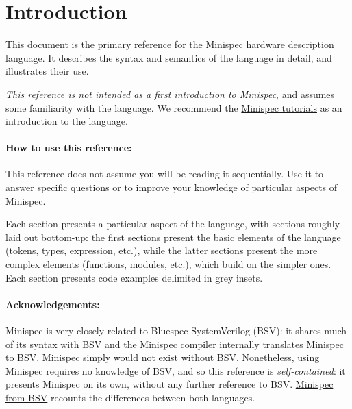 \section{Introduction}
\label{sec:intro}

This document is the primary reference for the Minispec hardware description language.
It describes the syntax and semantics of the language in detail, and illustrates their use.

\emph{This reference is not intended as a first introduction to Minispec}, and assumes some familiarity with the language.
We recommend the \href{https://6004.mit.edu/web/fall19/resources}{Minispec tutorials} as an introduction to the language.

\paragraph{How to use this reference:}
This reference does not assume you will be reading it sequentially.
Use it to answer specific questions or to improve your knowledge of particular aspects of Minispec.

Each section presents a particular aspect of the language, with sections roughly laid out bottom-up:
the first sections present the basic elements of the language (tokens, types, expression, etc.),
while the latter sections present the more complex elements (functions, modules, etc.), which build on the simpler ones.
Each section presents code examples delimited in \colorbox{codebg}{grey insets}.


\paragraph{Acknowledgements:}
Minispec is very closely related to Bluespec SystemVerilog (BSV): it shares much of its syntax with BSV
and the Minispec compiler internally translates Minispec to BSV.
Minispec simply would not exist without BSV.
Nonetheless, using Minispec requires no knowledge of BSV, and so
this reference is \emph{self-contained}: it presents Minispec on its own, without any further reference to BSV.
\href{https://6004.mit.edu/web/fall19/resources}{Minispec from BSV} recounts the differences between both languages.

